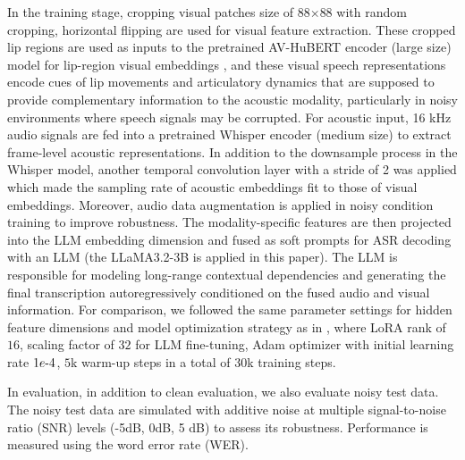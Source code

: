 \documentclass[conference]{IEEEtran}
\begin{document}
In the training stage, cropping visual patches size of 88$\times$88 with random cropping, horizontal flipping are used for visual feature extraction. These cropped lip regions are used as inputs to the pretrained AV-HuBERT encoder (large size) model for lip-region visual embeddings \cite{MaICASSP2023}, and these visual speech representations encode cues of lip movements and articulatory dynamics that are supposed to provide complementary information to the acoustic modality, particularly in noisy environments where speech signals may be corrupted. For acoustic input, 16 kHz audio signals are fed into a pretrained Whisper encoder (medium size) to extract frame-level acoustic representations. In addition to the downsample process in the Whisper model, another temporal convolution layer with a stride of 2 was applied which made the sampling rate of acoustic embeddings fit to those of visual embeddings. Moreover, audio data augmentation is applied in noisy condition training to improve robustness. The modality-specific features are then projected into the LLM embedding dimension and fused as soft prompts for ASR decoding with an LLM (the LLaMA3.2-3B is applied in this paper). The LLM is responsible for modeling long-range contextual dependencies and generating the final transcription autoregressively conditioned on the fused audio and visual information. For comparison, we followed the same parameter settings for hidden feature dimensions and model optimization strategy as in \cite{CappellazzoICASSP2025, MMSLLAMA2025}, where LoRA rank of $16$, scaling factor of $32$ for LLM fine-tuning, Adam optimizer with initial learning rate $1e{\text-}4$, $5$k warm-up steps in a total of $30$k training steps. 

In evaluation, in addition to clean evaluation, we also evaluate noisy test data. The noisy test data are simulated with additive noise at multiple signal-to-noise ratio (SNR) levels (-5dB, 0dB, 5 dB) to assess its robustness. Performance is measured using the word error rate (WER).
\end{document}
